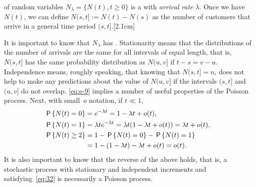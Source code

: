 \documentclass[stochastic-or.tex]{subfiles}
\begin{document}
 of random variables $N_\lambda=\{N(t), t\geq 0\}$ is a  with \emph{arrival rate} $\lambda$.
Once we have $N(t)$, we can define $N(s, t] := N(t)-N(s)$ as the number of customers that arrive in a general time period $(s, t]$.\marginnote{Note that $[0,t]$ is closed at both ends, but $(s,t]$ is open at the left.}[2.1cm]

It is important to know that $N_\lambda$ has .
Stationarity means that the distributions of the number of arrivals are the same for all intervals of equal length, that is, $N(s,t]$ has the same probability distribution as $N(u, v]$ if $t-s = v-u$.
Independence means, roughly speaking, that knowing that $N(s,t]= n$, does not help to make any predictions about the value of $N(u, v]$ if the intervals $(s,t]$ and $(u, v]$ do not overlap.
\cref{eq:e-9} implies a number of useful properties of the Poisson process.
Next, with small~$o$ notation, if $t\ll 1$,
\begin{subequations}\label{eq:32}
\begin{align}
\P{N( t) = 0} &= e^{-\lambda t} = 1-\lambda  t + o( t), \\
\P{N( t) = 1} &= \lambda t e^{-\lambda t} = \lambda t (1-\lambda t + o(t)) = \lambda  t + o( t), \label{eq:8} \\
\P{N( t)  \geq 2} &= 1 - \P{N(t) = 0} - \P{N(t)= 1} \\
  &= 1 - (1-\lambda t) - \lambda t + o(t) = o(t). \label{eq:10}
\end{align}
\end{subequations}
It is also important to know that the reverse of the above holds, that is, a stochastic process with stationary and independent increments and satisfying~\cref{eq:32} is necessarily a Poisson process.
\end{document}

